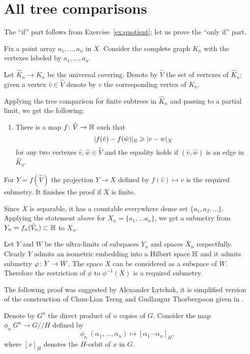 \section{All tree comparisons}\label{sec:all-tree}


The ``if'' part follows from Exercise~\ref{ex:quotient};
let us prove the ``only if'' part.

Fix a point array $a_1,\dots, a_n$ in $X$.
Consider the complete graph $K_n$ with the vertexes labeled by $a_1,\dots, a_n$.


Let $\hat K_n\to K_n$ be the universal covering.
Denote by $\hat  V$ the set of vertexes of $\hat  K_n$;
given a vertex $\hat  v\in\hat V$ denote by $v$ the corresponding vertex of $K_n$.

Applying the tree comparison for finite subtrees in $\hat  K_n$ and passing to a partial limit,  we get the following:

\begin{enumerate}[$({*})$]
\item There is a map $f\colon\hat V\to\mathbb{H}$ such that 
\[|f(\hat v)-f(\hat w)|_{\mathbb{H}}\geqslant |v-w|_X\]
for any two vertexes $\hat v,\hat w\in \hat  V$ and the equality holds if $(\hat v,\hat w)$ is an edge in $\hat  K_n$.
\end{enumerate}

For $Y=f(\hat V)$ the projection $Y\to X$ defined by $f(\hat v)\mapsto v$ is the required submetry.
It finishes the proof if $X$ is finite.

Since $X$ is separable, it has a countable everywhere dense set $\{a_1,a_2,\dots\}$. 
Applying the statement above for $X_n=\{a_1,\dots a_n\}$, we get 
a submetry from $Y_n=f_n(\hat V_n)\subset \mathbb{H}$ to $X_n$.

Let $Y$ and $W$ be the ultra-limits of subspaces $Y_n$ and spaces $X_n$ respectfully. 
Clearly $Y$ admits an isometric embedding into a Hilbert space $\mathbb{H}$ 
and it admits submetry $\phi\:Y\zz\to W$.
The space $X$ can be considered as a subspace of $W$.
Therefore the restriction of $\phi$ to $\phi^{-1}(X)$ is a required submetry.
\qeds


The following proof was suggested by Alexander Lytchak, it is simplified version of the construction of Chuu-Lian Terng and Gudlaugur Thorbergsson given in \cite[Section 4]{terng-thorbergsson}.


Denote by $G^n$ the direct product of $n$ copies of $G$.
Consider the map $\phi_n\:G^n\to G/\!\!/H$ defined by
\[\phi_n\:(\alpha_1,\dots,\alpha_n)\mapsto [\alpha_1\cdots\alpha_n]_H,\]
where $[x]_H$ denotes the $H$-orbit of $x$ in $G$.

